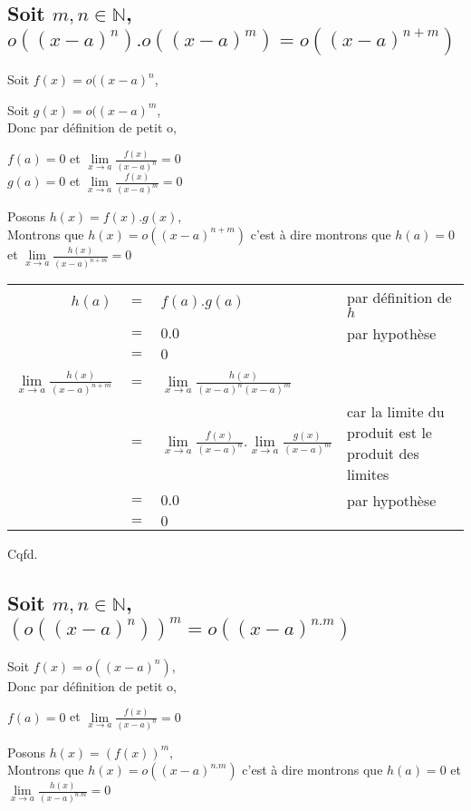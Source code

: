 \documentclass[a4paper,11pt]{report}
\begin{document}
\subsection{Soit $m,n \in \mathbb{N}$, $o((x-a)^n).o((x-a)^m) = o((x-a)^{n+m})$}
Soit $f(x) = o((x-a)^n$,

Soit $g(x) = o((x-a)^m$,\\
Donc par définition de petit o,
\begin{center}
	$f(a) = 0$ et $\lim\limits_{x \rightarrow a}{\frac{f(x)}{(x-a)^n} = 0}$\\
	$g(a) = 0$ et $\lim\limits_{x \rightarrow a}{\frac{f(x)}{(x-a)^m} = 0}$
\end{center}

Posons $h(x) = f(x).g(x)$,\\
Montrons que $h(x) = o((x-a)^{n+m})$ c'est à dire montrons que $h(a) = 0$ et $\lim\limits_{x \rightarrow a}{\frac{h(x)}{(x-a)^{n+m}}} = 0$
\begin{center}
\begin{tabular}{rcll}
$h(a)$ & $=$ & $f(a).g(a)$ & par définition de $h$\\
& $=$ & $0.0$ & par hypothèse \\
& $=$ & $0$ &\\
&&& \\
$\lim\limits_{x \rightarrow a}{\frac{h(x)}{(x-a)^{n+m}}}$ & $=$ & $\lim\limits_{x \rightarrow a}{\frac{h(x)}{(x-a)^n (x-a)^{m}}}$ & \\
& $=$ & $\lim\limits_{x \rightarrow a}{\frac{f(x)}{(x-a)^n}}.\lim\limits_{x \rightarrow a}{\frac{g(x)}{(x-a)^m}}$ & car la limite du produit est le produit des limites\\
& $=$ & $0.0$ & par hypothèse\\
& $=$ & $0$ & \\
\end{tabular}
\end{center}
Cqfd.

\subsection{Soit $m,n \in \mathbb{N}$, $(o((x-a)^n))^m = o((x-a)^{n.m})$}
Soit $f(x) = o((x-a)^n)$,\\
Donc par définition de petit o,
\begin{center}
	$f(a) = 0$ et $\lim\limits_{x \rightarrow a}{\frac{f(x)}{(x-a)^n} = 0}$
\end{center}

Posons $h(x) = (f(x))^m$,\\
Montrons que $h(x) = o((x-a)^{n.m})$ c'est à dire montrons que $h(a) = 0$ et $\lim\limits_{x \rightarrow a}{\frac{h(x)}{(x-a)^{n.m}}} = 0$
\end{document}
